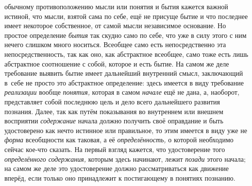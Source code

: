 обычному противоположению мысли или понятия и бытия кажется важной истиной,
что мысли, взятой сама по себе, ещё не присуще бытие и что последнее имеет
некоторое собственное, от самой мысли независимое основание. Но простое
определение {\em бытия}
так скудно само по себе, что уже в силу этого с ним нечего
слишком много носиться. Всеобщее само есть непосредственно эта
непосредственность, так как оно, как абстрактное всеобщее, само тоже есть
лишь абстрактное соотношение с собой, которое и есть бытие. На самом же
деле требование выявить бытие имеет дальнейший внутренний
смысл, заключающий в~себе не просто это абстрактное определение: здесь
имеется в виду требование {\em реализации} вообще
{\em понятия,} которая в самом {\em начале} ещё не
дана, а, наоборот, представляет собой последнюю цель и дело всего
дальнейшего развития познания. Далее, так как путём показывания во
внутреннем или внешнем восприятии {\em содержание} начала
должно получить своё оправдание и быть удостоверено как нечто истинное или
правильное, то этим имеется в виду уже не
{\em форма} всеобщности
как таковая, а её {\em определённость,}
о которой необходимо сейчас кое-что сказать. На первый взгляд
кажется, что удостоверение того {\em определённого содержания,}
которым здесь начинают, лежит {\em позади} этого начала;
на самом же деле это удостоверение должно рассматриваться как движение
вперёд, если только оно принадлежит к постигающему в понятиях познанию.

